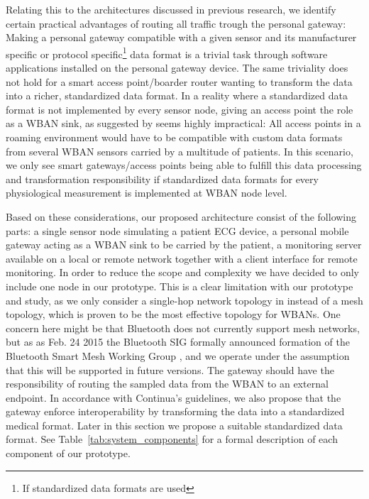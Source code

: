 Relating this to the architectures discussed in previous research, we identify certain practical advantages of routing all traffic trough the personal gateway: Making a personal gateway compatible with a given sensor and its manufacturer specific or protocol specific\footnote{If standardized data formats are used} data format is a trivial task through software applications installed on the personal gateway device. The same triviality does not hold for a smart access point/boarder router wanting to transform the data into a richer, standardized data format. In a reality where a standardized data format is not implemented by every sensor node, giving an access point the role as a WBAN sink, as suggested by \cite{DrAmirMohammadRahmani:2014vx} seems highly impractical: All access points in a roaming environment would have to be compatible with custom data formats from several WBAN sensors carried by a multitude of patients. In this scenario, we only see smart gateways/access points being able to fulfill this data processing and transformation responsibility if standardized data formats for every physiological measurement is implemented at WBAN node level.

Based on these considerations, our proposed architecture consist of the following parts: a single sensor node simulating a patient ECG device, a personal mobile gateway acting as a WBAN sink to be carried by the patient, a monitoring server available on a local or remote network together with a client interface for remote monitoring. In order to reduce the scope and complexity we have decided to only include one node in our prototype. This is a clear limitation with our prototype and study, as we only consider a single-hop network topology in instead of a mesh topology, which is proven to be the most effective topology for WBANs. One concern here might be that Bluetooth does not currently support mesh networks, but as as Feb. 24 2015 the Bluetooth SIG formally announced formation of the Bluetooth Smart Mesh Working Group \cite{bt:sig:mesh}, and we operate under the assumption that this will be supported in future versions. The gateway should have the responsibility of routing the sampled data from the WBAN to an external endpoint. In accordance with Continua's guidelines, we also propose that the gateway enforce interoperability by transforming the data into a standardized medical format. Later in this section we propose a suitable  standardized data format. See Table~\ref{tab:system_components} for a formal description of each component of our prototype.


